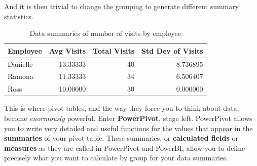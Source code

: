 \documentclass[
]{book}
\newenvironment{Shaded}{\begin{snugshade}}{\end{snugshade}}
\newcommand{\DataTypeTok}[1]{\textcolor[rgb]{0.13,0.29,0.53}{#1}}
\newcommand{\KeywordTok}[1]{\textcolor[rgb]{0.13,0.29,0.53}{\textbf{#1}}}
\newcommand{\NormalTok}[1]{#1}
\newcommand{\OperatorTok}[1]{\textcolor[rgb]{0.81,0.36,0.00}{\textbf{#1}}}
\newcommand{\StringTok}[1]{\textcolor[rgb]{0.31,0.60,0.02}{#1}}
\begin{document}
And it is then trivial to change the grouping to generate different summary statistics.

\begin{Shaded}
\end{Shaded}

\begin{table}

\caption{\label{tab:unnamed-chunk-12}Data summaries of number of visits by employee}
\centering
\begin{tabular}[t]{l|r|r|r}
\hline
Employee & Avg Visits & Total Visits & Std Dev of Visits\\
\hline
Danielle & 13.33333 & 40 & 8.736895\\
\hline
Ramona & 11.33333 & 34 & 6.506407\\
\hline
Ross & 10.00000 & 30 & 0.000000\\
\hline
\end{tabular}
\end{table}

This is where pivot tables, and the way they force you to think about data, become \emph{enormously} powerful. Enter \textbf{PowerPivot}, stage left. PowerPivot allows you to write very detailed and useful functions for the values that appear in the \textbf{summaries} of your pivot table. These summaries, or \textbf{calculated fields} or \textbf{measures} as they are called in PowerPivot and PowerBI, allow you to define precisely what you want to calculate by group for your data summaries.
\end{document}
